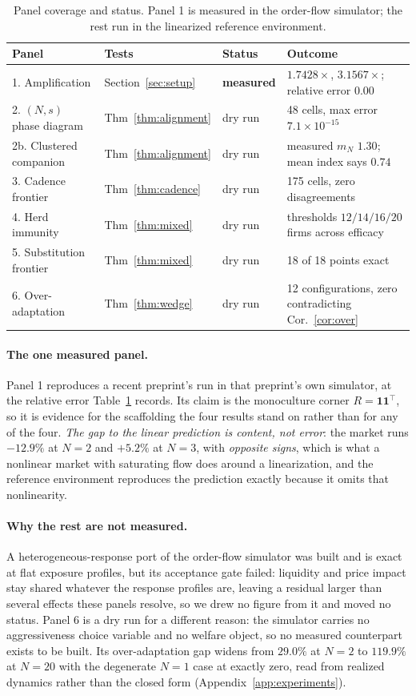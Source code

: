 \documentclass{article}
\theoremstyle{plain}
\theoremstyle{definition}
\newcommand{\mN}{m_N}
\begin{document}
\begin{table}[!t]
\centering
\caption{Panel coverage and status. Panel 1 is measured in the order-flow simulator; the rest run in the linearized reference environment.}
\label{tab:panels}
\small
\begin{tabular}{llll}
\toprule
Panel & Tests & Status & Outcome \\
\midrule
1. Amplification & Section~\ref{sec:setup} & \textbf{measured} & $1.7428\times$, $3.1567\times$; relative error $0.00$ \\
2. $(N,s)$ phase diagram & Thm~\ref{thm:alignment} & dry run & 48 cells, max error $7.1\times 10^{-15}$ \\
2b. Clustered companion & Thm~\ref{thm:alignment} & dry run & measured $\mN$ $1.30$; mean index says $0.74$ \\
3. Cadence frontier & Thm~\ref{thm:cadence} & dry run & 175 cells, zero disagreements \\
4. Herd immunity & Thm~\ref{thm:mixed} & dry run & thresholds $12/14/16/20$ firms across efficacy \\
5. Substitution frontier & Thm~\ref{thm:mixed} & dry run & 18 of 18 points exact \\
6. Over-adaptation & Thm~\ref{thm:wedge} & dry run & 12 configurations, zero contradicting Cor.~\ref{cor:over} \\
\bottomrule
\end{tabular}
\end{table}

\paragraph{The one measured panel.}
Panel 1 reproduces a recent preprint's run in that preprint's own simulator, at the relative error Table~\ref{tab:panels} records. Its claim is the monoculture corner $R = \mathbf{1}\mathbf{1}^{\top}$, so it is evidence for the scaffolding the four results stand on rather than for any of the four. \emph{The gap to the linear prediction is content, not error}: the market runs $-12.9\%$ at $N=2$ and $+5.2\%$ at $N=3$, with \emph{opposite signs}, which is what a nonlinear market with saturating flow does around a linearization, and the reference environment reproduces the prediction exactly because it omits that nonlinearity.

\paragraph{Why the rest are not measured.}
A heterogeneous-response port of the order-flow simulator was built and is exact at flat exposure profiles, but its acceptance gate failed: liquidity and price impact stay shared whatever the response profiles are, leaving a residual larger than several effects these panels resolve, so we drew no figure from it and moved no status. Panel 6 is a dry run for a different reason: the simulator carries no aggressiveness choice variable and no welfare object, so no measured counterpart exists to be built. Its over-adaptation gap widens from $29.0\%$ at $N=2$ to $119.9\%$ at $N=20$ with the degenerate $N=1$ case at exactly zero, read from realized dynamics rather than the closed form (Appendix~\ref{app:experiments}).
\end{document}
